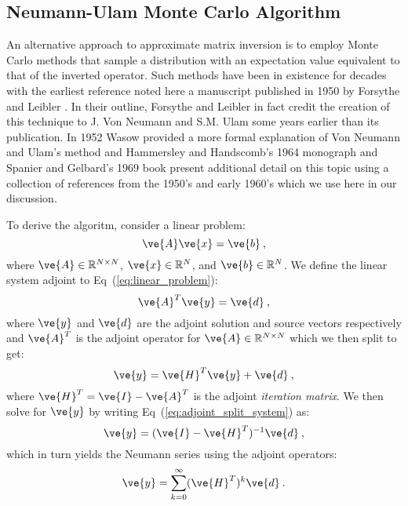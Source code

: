 \documentclass[letterpaper,11pt]{article}
\begin{document}
\subsection{Neumann-Ulam Monte Carlo Algorithm}
An alternative approach to approximate matrix inversion is to employ
Monte Carlo methods that sample a distribution with an expectation
value equivalent to that of the inverted operator. Such methods have
been in existence for decades with the earliest reference noted here a
manuscript published in 1950 by Forsythe and Leibler
\cite{forsythe_matrix_1950}. In their outline, Forsythe and Leibler
in fact credit the creation of this technique to J. Von Neumann and
S.M. Ulam some years earlier than its publication. In 1952 Wasow
provided a more formal explanation of Von Neumann and Ulam's method
\cite{wasow_note_1952} and Hammersley and Handscomb's 1964 monograph
\cite{hammersley_monte_1964} and Spanier and Gelbard's 1969 book
\cite{spanier_monte_1969} present additional detail on this topic
using a collection of references from the 1950's and early
1960's which we use here in our discussion.

To derive the algoritm, consider a linear problem:
\begin{equation}
  \ve{A} \ve{x} = \ve{b}\:,
  \label{eq:linear_problem}
\end{equation}
where $\ve{A} \in \mathbb{R}^{N \times N}$, $\ve{x} \in \mathbb{R}^N$,
and $\ve{b} \in \mathbb{R}^N$. We define the linear system adjoint to
Eq~(\ref{eq:linear_problem}):
\begin{equation}
  \ve{A}^T \ve{y} = \ve{d}\:,
  \label{eq:adjoint_linear_problem}
\end{equation}
where $\ve{y}$ and $\ve{d}$ are the adjoint solution and source
vectors respectively and $\ve{A}^T$ is the adjoint operator for
$\ve{A} \in \mathbb{R}^{N \times N}$ which we then split to get:
\begin{equation}
  \ve{y} = \ve{H}^T \ve{y} + \ve{d}\:,
  \label{eq:adjoint_split_system}
\end{equation}
where $\ve{H}^T = \ve{I} - \ve{A}^T$ is the adjoint \textit{iteration
  matrix}.  We then solve for $\ve{y}$ by writing
Eq~(\ref{eq:adjoint_split_system}) as:
\begin{equation}
  \ve{y} = (\ve{I} - \ve{H}^T)^{-1} \ve{d}\:,
  \label{eq:adjoint_split_system_2}
\end{equation}
which in turn yields the Neumann series using the adjoint operators:
\begin{equation}
  \ve{y} = \sum_{k=0}^{\infty} (\ve{H}^T)^k\ve{d}\:.
  \label{eq:adjoint_neumann_series}
\end{equation}
\end{document}
